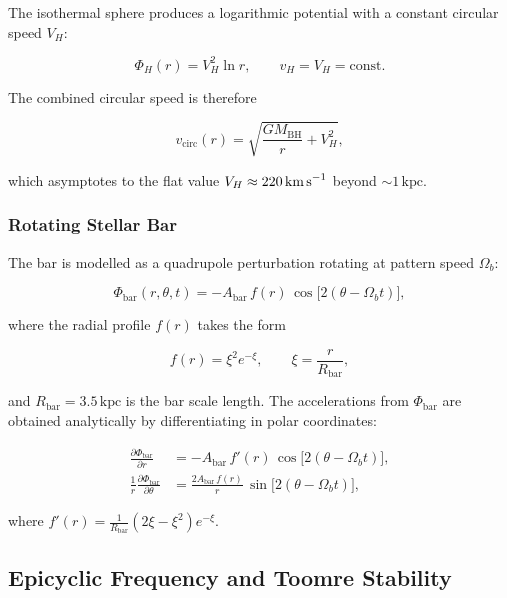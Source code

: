 \documentclass[12pt, letterpaper]{article}
\begin{document}
The isothermal sphere produces a logarithmic potential with a constant circular speed $V_H$:

\begin{equation}
    \Phi_H(r) = V_H^2 \ln r, \qquad
    v_H = V_H = \text{const}.
\end{equation}

The combined circular speed is therefore

\begin{equation}
    v_\text{circ}(r) = \sqrt{\frac{G M_\text{BH}}{r} + V_H^2},
\end{equation}

which asymptotes to the flat value $V_H \approx 220\,\text{km\,s}^{-1}$ beyond $\sim\!1\,\text{kpc}$.

\subsubsection{Rotating Stellar Bar}

The bar is modelled as a quadrupole perturbation rotating at pattern speed $\Omega_b$:

\begin{equation}
    \Phi_\text{bar}(r, \theta, t) = -A_\text{bar}\, f(r)\, \cos\!\bigl[2(\theta - \Omega_b t)\bigr],
\end{equation}

where the radial profile $f(r)$ takes the form

\begin{equation}
    f(r) = \xi^2 e^{-\xi}, \qquad \xi = \frac{r}{R_\text{bar}},
\end{equation}

and $R_\text{bar} = 3.5\,\text{kpc}$ is the bar scale length. The accelerations from $\Phi_\text{bar}$ are obtained analytically by differentiating in polar coordinates:

\begin{align}
    \frac{\partial \Phi_\text{bar}}{\partial r} &= -A_\text{bar}\, f'(r)\, \cos\!\bigl[2(\theta - \Omega_b t)\bigr], \\
    \frac{1}{r}\frac{\partial \Phi_\text{bar}}{\partial \theta} &= \frac{2 A_\text{bar}\, f(r)}{r}\, \sin\!\bigl[2(\theta - \Omega_b t)\bigr],
\end{align}

where $f'(r) = \frac{1}{R_\text{bar}}(2\xi - \xi^2)e^{-\xi}$.

\subsection{Epicyclic Frequency and Toomre Stability}
\end{document}

